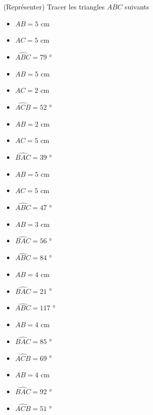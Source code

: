  (Représenter) Tracer les triangles $ABC$ suivants

\begin{multicols}{4}
\begin{itemize}
\item $AB=5$ cm
\item $AC=5$ cm
\item $\widehat{ABC}=79$ °
\end{itemize}

\begin{itemize}
\item $AB=5$ cm
\item $AC=2$ cm
\item $\widehat{ACB}=52$ °
\end{itemize}\columnbreak

\begin{itemize}
\item $AB=2$ cm
\item $AC=5$ cm
\item $\widehat{BAC}=39$ °
\end{itemize}

\begin{itemize}
\item $AB=5$ cm
\item $AC=5$ cm
\item $\widehat{ABC}=47$ °
\end{itemize}

\begin{itemize}
\item $AB=3$ cm
\item $\widehat{BAC}=56$ °
\item $\widehat{ABC}=84$ °
\end{itemize}

\begin{itemize}
\item $AB=4$ cm
\item $\widehat{BAC}=21$ °
\item $\widehat{ABC}=117$ °
\end{itemize}

\begin{itemize}
\item $AB=4$ cm
\item $\widehat{BAC}=85$ °
\item $\widehat{ACB}=69$ °
\end{itemize}

\begin{itemize}
\item $AB=4$ cm
\item $\widehat{BAC}=92$ °
\item $\widehat{ACB}=51$ °
\end{itemize}

\end{multicols}